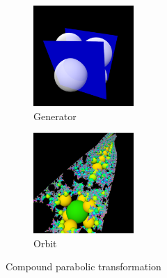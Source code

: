 \begin{figure}[h!tbp]
\begin{minipage}{0.49\hsize}
 \end{minipage}
 \begin{minipage}{0.49\hsize}
  \begin{subfigure}{0.24\textwidth}
   \begin{center}
    \includegraphics[width=1.5in, height=1.5in, keepaspectratio]{../img/klein/3diis/compParabolicGen.pdf}
    \caption{Generator}
    \label{fig:compParabolicGen}
   \end{center}
  \end{subfigure}
 \hspace*{\fill}
 \begin{subfigure}{0.24\textwidth}
  \begin{center}
   \includegraphics[width=1.5in, height=1.5in, keepaspectratio]{../img/klein/3diis/compParabolicOrb.pdf}
   \caption{Orbit}
   \label{fig:compParabolicOrb}
  \end{center}
 \end{subfigure}
 \hspace*{\fill}
\caption{Compound parabolic transformation}
 \label{fig:compParabolic}
 \end{minipage}
\end{figure}

